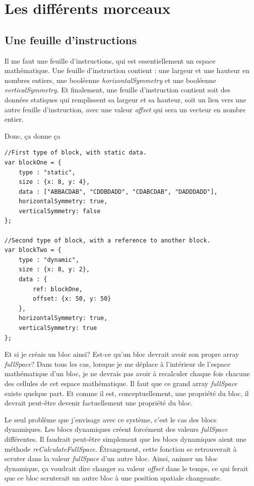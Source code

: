 \section{Les différents morceaux}

\subsection{Une feuille d'instructions}

Il me faut une feuille d'instructions, qui est essentiellement un espace mathématique. Une feuille d'instruction contient : une largeur et une hauteur en nombres entiers, une booléenne \textit{horizontalSymmetry} et une booléenne \textit{verticalSymmetry}. Et finalement, une feuille d'instruction contient soit des données statiques qui remplissent sa largeur et sa hauteur, soit un lien vers une autre feuille d'instruction, avec une valeur \textit{offset} qui sera un vecteur en nombre entier.

Donc, ça donne ça
\begin{lstlisting}
//First type of block, with static data.
var blockOne = {
    type : "static",
    size : {x: 8, y: 4},
    data : ["ABBACDAB", "CDDBDADD", "CDABCDAB", "DADDDADD"],
    horizontalSymmetry: true,
    verticalSymmetry: false
};

//Second type of block, with a reference to another block.
var blockTwo = {
    type : "dynamic",
    size : {x: 8, y: 2},
    data : {
        ref: blockOne,
        offset: {x: 50, y: 50}
    },
    horizontalSymmetry: true,
    verticalSymmetry: true
};
\end{lstlisting}
\newpage
Et si je créais un bloc ainsi? Est-ce qu'un bloc devrait avoir son propre array \textit{fullSpace}? Dans tous les cas, lorsque je me déplace à l'intérieur de l'espace mathématique d'un bloc, je ne devrais pas avoir à recalculer chaque fois chacune des cellules de cet espace mathématique. Il faut que ce grand array \textit{fullSpace} existe quelque part. Et comme il est, conceptuellement, une propriété du bloc, il devrait peut-être devenir factuellement une propriété du bloc. 

Le seul problème que j'envisage avec ce système, c'est le cas des blocs dynamiques. Les blocs dynamiques créent forcément des valeurs \textit{fullSpace} différentes. Il faudrait peut-être simplement que les blocs dynamiques aient une méthode \textit{reCalculateFullSpace}. Étrangement, cette fonction se retrouverait à scruter dans la valeur \textit{fullSpace} d'un autre bloc. Ainsi, animer un bloc dynamique, ça voudrait dire changer sa valeur \textit{offset} dans le temps, ce qui ferait que ce bloc scruterait un autre bloc à une position spatiale changeante.

